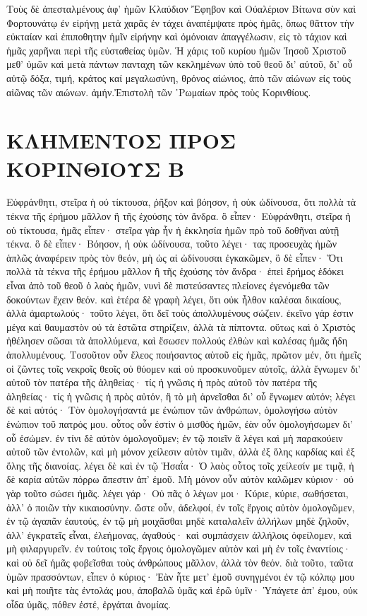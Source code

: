 Τοὺς δὲ ἀπεσταλμένους ἀφ’ ἡμῶν Κλαύδιον Ἔφηβον καὶ Οὐαλέριον Βίτωνα σὺν καὶ Φορτουνάτῳ ἐν εἰρήνῃ μετὰ χαρᾶς ἐν τάχει ἀναπέμψατε πρὸς ἡμᾶς, ὅπως θᾶττον τὴν εὐκταίαν καὶ ἐπιποθητην ἡμῖν εἰρήνην καὶ ὁμόνοιαν ἀπαγγέλωσιν, εἰς τὸ τάχιον καὶ ἡμᾶς χαρῆναι περὶ τῆς εὐσταθείας ὑμῶν.
Ἡ χάρις τοῦ κυρίου ἡμῶν Ἰησοῦ Χριστοῦ μεθ’ ὑμῶν καὶ μετὰ πάντων πανταχη τῶν κεκλημένων ὑπὸ τοῦ θεοῦ δι’ αὐτοῦ, δι’ οὗ αὐτῷ δόξα, τιμή, κράτος καί μεγαλωσύνη, θρόνος αἰώνιος, ἀπὸ τῶν αἰώνων εἰς τοὺς αἰῶνας τῶν αιώνων. ἀμήν.Ἐπιστολὴ τῶν ῾Ρωμαίων πρὸς τοὺς Κορινθίους.
\section{ΚΛΗΜΕΝΤΟΣ ΠΡΟΣ ΚΟΡΙΝΘΙΟΥΣ Β}
Εὐφράνθητι, στεῖρα ἡ οὐ τίκτουσα, ῥῆξον καὶ βόησον, ἡ οὐκ ὠδίνουσα, ὅτι πολλὰ τὰ τέκνα τῆς ἐρήμου μᾶλλον ἢ τῆς ἐχούσης τὸν ἄνδρα. ὃ εἶπεν· Εὐφράνθητι, στεῖρα ἡ οὐ τίκτουσα, ἡμᾶς εἶπεν· στεῖρα γὰρ ἦν ἡ ἐκκλησία ἡμῶν πρὸ τοῦ δοθῆναι αὐτῇ τέκνα. ὃ δὲ εἶπεν· Βόησον, ἡ οὐκ ὠδίνουσα, τοῦτο λέγει· τας προσευχὰς ἡμῶν ἁπλῶς ἀναφέρειν πρὸς τὸν θεόν, μὴ ὡς αἱ ὠδίνουσαι ἐγκακῶμεν, ὃ δὲ εἶπεν· Ὅτι πολλὰ τὰ τέκνα τῆς ἐρήμου μᾶλλον ἢ τῆς ἐχούσης τὸν ἄνδρα· ἐπεὶ ἔρήμος ἐδόκει εἶναι ἀπὸ τοῦ θεοῦ ὁ λαὸς ἡμῶν, νυνὶ δὲ πιστεύσαντες πλείονες ἐγενόμεθα τῶν δοκούντων ἔχειν θεόν. καὶ ἑτέρα δὲ γραφὴ λέγει, ὅτι οὐκ ἦλθον καλέσαι δικαίους, ἀλλὰ ἁμαρτωλούς· τοῦτο λέγει, ὅτι δεῖ τοὺς ἀπολλυμένους σώζειν. ἐκεῖνο γάρ ἐστιν μέγα καὶ θαυμαστὸν οὐ τὰ ἑστῶτα στηρίζειν, ἀλλὰ τὰ πίπτοντα. οὕτως καὶ ὁ Χριστὸς ἠθέλησεν σῶσαι τὰ ἀπολλύμενα, καὶ ἔσωσεν πολλούς ἐλθὼν καὶ καλέσας ἡμᾶς ἤδη ἀπολλυμένους.
Τοσοῦτον οὖν ἔλεος ποιήσαντος αὐτοῦ εἰς ἡμᾶς, πρῶτον μέν, ὅτι ἡμεῖς οἱ ζῶντες τοῖς νεκροῖς θεοῖς οὐ θύομεν καὶ οὐ προσκυνοῦμεν αὐτοῖς, ἀλλὰ ἔγνωμεν δι’ αὐτοῦ τὸν πατέρα τῆς ἀληθείας· τίς ἡ γνῶσις ἡ πρὸς αὐτοῦ τὸν πατέρα τῆς ἀληθείας· τίς ἡ γνῶσις ἡ πρὸς αὐτόν, ἢ τὸ μὴ ἀρνεῖσθαι δι’ οὗ ἔγνωμεν αὐτόν; λέγει δὲ καὶ αὐτός· Τὸν ὁμολογήσαντά με ἐνώπιον τῶν ἀνθρώπων, ὁμολογήσω αὐτὸν ἐνώπιον τοῦ πατρός μου. οὗτος οὖν ἐστὶν ὁ μισθὸς ἡμῶν, ἐὰν οὖν ὁμολογήσωμεν δι’ οὗ ἐσώμεν. ἐν τίνι δὲ αὐτὸν ὁμολογοῦμεν; ἐν τῷ ποιεῖν ἃ λέγει καὶ μὴ παρακούειν αὐτοῦ τῶν ἐντολῶν, καὶ μὴ μόνον χείλεσιν αὐτὸν τιμᾶν, ἀλλὰ ἐξ ὅλης καρδίας καὶ ἐξ ὅλης τῆς διανοίας. λέγει δὲ καὶ ἐν τῷ Ἡσαΐα· Ὁ λαὸς οὗτος τοῖς χείλεσίν με τιμᾷ, ἡ δὲ καρία αὐτῶν πόρρω ἄπεστιν ἀπ’ ἐμοῦ.
Μὴ μόνον οὖν αὐτὸν καλῶμεν κύριον· οὐ γὰρ τοῦτο σώσει ἡμᾶς. λέγει γάρ· Οὐ πᾶς ὁ λέγων μοι· Κύριε, κύριε, σωθήσεται, ἀλλ’ ὁ ποιῶν τὴν κικαιοσύνην. ὥστε οὖν, ἀδελφοί, ἐν τοῖς ἔργοις αὐτὸν ὁμολογῶμεν, ἐν τῷ ἀγαπᾶν ἐαυτούς, ἐν τῷ μὴ μοιχᾶσθαι μηδὲ καταλαλεῖν ἀλλήλων μηδὲ ζηλοῦν, ἀλλ’ ἐγκρατεῖς εἶναι, ἐλεήμονας, ἀγαθούς· καὶ συμπάσχειν ἀλλήλοις ὀφείλομεν, καὶ μὴ φιλαργυρεῖν. ἐν τούτοις τοῖς ἔργοις ὁμολογῶμεν αὐτὸν καὶ μὴ ἐν τοῖς ἐναντίοις· καὶ οὐ δεῖ ἡμᾶς φοβεῖσθαι τοὺς ἀνθρώπους μᾶλλον, ἀλλὰ τὸν θεόν. διὰ τοῦτο, ταῦτα ὑμῶν πρασσόντων, εἶπεν ὁ κύριος· Ἐὰν ἦτε μετ’ ἐμοῦ συνηγμένοι ἐν τῷ κόλπῳ μου καὶ μὴ ποιῆτε τὰς ἐντολάς μου, ἀποβαλῶ ὑμᾶς καὶ ἐρῶ ὑμῖν· Ὑπάγετε ἀπ’ ἐμου, οὐκ οἶδα ὑμᾶς, πόθεν ἐστέ, ἐργάται ἀνομίας.
